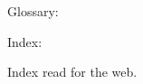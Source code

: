 \documentclass{article}
\begin{document}
Glossary: \ownprimglossary\par
Index: \ownprimindex
\ifdefined\printindex\par Index read for the web.\fi
\end{document}
